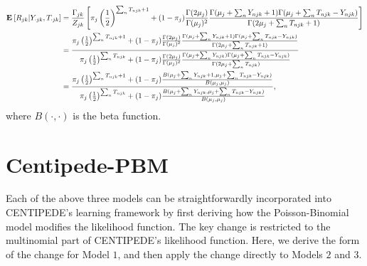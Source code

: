 \documentclass[reqno]{amsart}
\numberwithin{equation}{section}
\begin{document}
\begin{align}
    \mathbf{E}_{}\left[R_{jk} | Y_{\cdot jk}, T_{\cdot jk}\right]
        &= \frac{\Gamma_{jk}}{Z_{jk}} \left[ \pi_j \left( \frac{1}{2} \right)^{\sum_n T_{njk}+1} + (1-\pi_j) \frac{\Gamma(2\mu_j)}{\Gamma(\mu_j)^2}
        \frac{\Gamma(\mu_j+\sum_n Y_{njk}+1) \Gamma(\mu_j+\sum_n T_{njk} - Y_{njk})}{\Gamma(2\mu_j+\sum_n T_{njk}+1)} \right] \\
        &= \frac{\pi_j \left( \frac{1}{2} \right)^{\sum_n T_{njk}+1} + (1-\pi_j) \frac{\Gamma(2\mu_j)}{\Gamma(\mu_j)^2}
        \frac{\Gamma(\mu_j+\sum_n Y_{njk}+1) \Gamma(\mu_j+\sum_n T_{njk} - Y_{njk})}{\Gamma(2\mu_j+\sum_n T_{njk}+1)}}
        {\pi_j \left( \frac{1}{2} \right)^{\sum_n T_{njk}} + (1-\pi_j) \frac{\Gamma(2\mu_j)}{\Gamma(\mu_j)^2}
        \frac{\Gamma(\mu_j+\sum_n Y_{njk}) \Gamma(\mu_j+\sum_n T_{njk} - Y_{njk})}{\Gamma(2\mu_j+\sum_n T_{njk})}} \\
        &= \frac{\pi_j \left( \frac{1}{2} \right)^{\sum_n T_{njk}+1} 
        + (1-\pi_j) \frac{B(\mu_j+\sum_n Y_{njk}+1,\mu_j+\sum_n T_{njk} - Y_{njk})}{B(\mu_j,\mu_j)}}
        {\pi_j \left( \frac{1}{2} \right)^{\sum_n T_{njk}} + (1-\pi_j) \frac{B(\mu_j+\sum_n Y_{njk},\mu_j+\sum_n T_{njk} - Y_{njk})}{B(\mu_j,\mu_j)}},
\end{align}
where $B(\cdot,\cdot)$ is the beta function.

\section{Centipede-PBM}

Each of the above three models can be straightforwardly incorporated into CENTIPEDE's learning framework by first deriving 
how the Poisson-Binomial model modifies the likelihood function. The key change is restricted to the multinomial part
of CENTIPEDE's likelihood function. Here, we derive the form of the change for Model $1$, and then apply the change
directly to Models $2$ and $3$.
\end{document}
